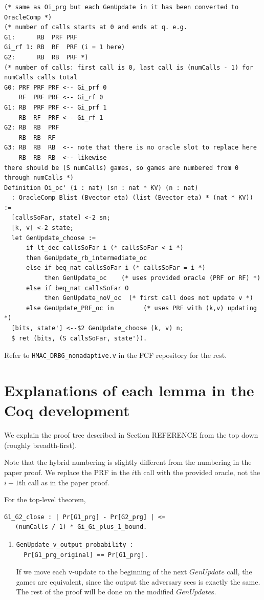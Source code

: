 \documentclass[12pt,lot, lof]{puthesis}
\newcommand{\li} {\lstinline}
\begin{document}
{\begin{lstlisting}
(* same as Oi_prg but each GenUpdate in it has been converted to OracleComp *)
(* number of calls starts at 0 and ends at q. e.g.
G1:      RB  PRF PRF
Gi_rf 1: RB  RF  PRF (i = 1 here)
G2:      RB  RB  PRF *)
(* number of calls: first call is 0, last call is (numCalls - 1) for numCalls calls total
G0: PRF PRF PRF <-- Gi_prf 0
    RF  PRF PRF <-- Gi_rf 0
G1: RB  PRF PRF <-- Gi_prf 1
    RB  RF  PRF <-- Gi_rf 1
G2: RB  RB  PRF
    RB  RB  RF
G3: RB  RB  RB  <-- note that there is no oracle slot to replace here
    RB  RB  RB  <-- likewise
there should be (S numCalls) games, so games are numbered from 0 through numCalls *)
Definition Oi_oc' (i : nat) (sn : nat * KV) (n : nat) 
  : OracleComp Blist (Bvector eta) (list (Bvector eta) * (nat * KV)) :=
  [callsSoFar, state] <-2 sn;
  [k, v] <-2 state;
  let GenUpdate_choose := 
      if lt_dec callsSoFar i (* callsSoFar < i *)
      then GenUpdate_rb_intermediate_oc
      else if beq_nat callsSoFar i (* callsSoFar = i *)
           then GenUpdate_oc    (* uses provided oracle (PRF or RF) *)
      else if beq_nat callsSoFar O 
           then GenUpdate_noV_oc  (* first call does not update v *)
      else GenUpdate_PRF_oc in        (* uses PRF with (k,v) updating *)
  [bits, state'] <--$2 GenUpdate_choose (k, v) n;
  $ ret (bits, (S callsSoFar, state')).
  \end{lstlisting}

Refer to \li|HMAC_DRBG_nonadaptive.v| in the FCF repository for the rest.


\chapter{Explanations of each lemma in the Coq development}

We explain the proof tree described in Section REFERENCE from the top down (roughly breadth-first).

Note that the hybrid numbering is slightly different from the numbering in the paper proof. We replace the PRF in the $i$th call with the provided oracle, not the $i+1$th call as in the paper proof.

For the top-level theorem, 
\begin{lstlisting}
G1_G2_close : | Pr[G1_prg] - Pr[G2_prg] | <= 
   (numCalls / 1) * Gi_Gi_plus_1_bound.
\end{lstlisting}
\begin{enumerate}
\par
\item \begin{lstlisting}
GenUpdate_v_output_probability :
  Pr[G1_prg_original] == Pr[G1_prg].
  \end{lstlisting}
If we move each v-update to the beginning of the next $GenUpdate$ call, the games are equivalent, since the output the adversary sees is exactly the same. The rest of the proof will be done on the modified $GenUpdate$s.


\end{enumerate}}
\end{document}
